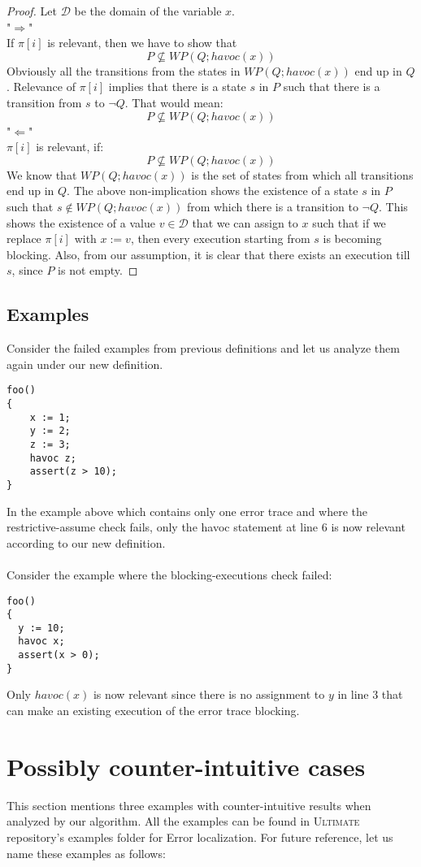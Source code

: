 \documentclass{article}
\newcommand{\ultimate}{\textsc{Ultimate}\xspace} %
\begin{document}
\begin{proof}
Let $\mathcal{D}$ be the domain of the variable $x$. \\
"$\Rightarrow$"\\
If $\pi[i]$ is relevant, then we have to show that\\
$$P \not \subseteq WP(Q;havoc(x))$$
Obviously all the transitions from the states in $WP(Q;havoc(x))$ end up in $Q$. Relevance of $\pi[i]$ implies that there is a state $s$ in $P$ such that there is a transition from $s$ to $\neg Q$. That would mean:
$$P \not \subseteq WP(Q;havoc(x))$$
"$\Leftarrow$"\\
$\pi[i]$ is relevant, if:
$$P \not \subseteq WP(Q;havoc(x))$$
We know that $WP(Q;havoc(x))$ is the set of states from which all transitions end up in $Q$. The above non-implication shows the existence of a state $s$ in $P$ such that $s \not \in WP(Q; havoc(x))$  from which there is a transition to $\neg Q$. This shows the existence of a value $v \in \mathcal{D}$ that we can assign to $x$ such that if we replace $\pi[i]$ with $x:=v$, then every execution starting from $s$ is becoming blocking. Also, from our assumption, it is clear that there exists an execution till $s$, since $P$ is not empty.
\end{proof}
\subsection{Examples}
Consider the failed examples from previous definitions and let us analyze them again under our new definition.
\begin{lstlisting}
foo()
{
	x := 1;
	y := 2;
	z := 3;
	havoc z;
	assert(z > 10);
}
\end{lstlisting}
In the example above which contains only one error trace and where the restrictive-assume check fails, only the havoc statement at line 6 is now relevant according to our new definition. \\
\\
Consider the example where the blocking-executions check failed:
\begin{lstlisting}
foo()
{
  y := 10;
  havoc x;
  assert(x > 0);
}
\end{lstlisting}
Only $havoc(x)$ is now relevant since there is no assignment to $y$ in line 3 that can make an existing execution of the error trace blocking.


\section{Possibly counter-intuitive cases}
This section mentions three examples with  counter-intuitive results when analyzed by our algorithm. All the examples can be found in \ultimate repository's examples folder for Error localization. For future reference, let us name these examples as follows:
\end{document}
